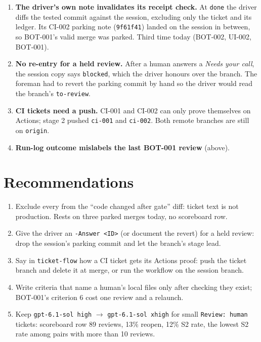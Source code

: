 \documentclass[11pt,a4paper]{article}
\begin{document}
\begin{enumerate}
  \item \textbf{The driver's own note invalidates its receipt check.} At \texttt{done} the
        driver diffs the tested commit against the session, excluding only the ticket and its
        ledger. Its CI-002 parking note (\texttt{9f61f41}) landed on the session in between,
        so BOT-001's valid merge was parked. Third time today (BOT-002, UI-002, BOT-001).
  \item \textbf{No re-entry for a held review.} After a human answers a \emph{Needs your
        call}, the session copy says \texttt{blocked}, which the driver honours over the
        branch. The foreman had to revert the parking commit by hand so the driver would read
        the branch's \texttt{to-review}.
  \item \textbf{CI tickets need a push.} CI-001 and CI-002 can only prove themselves on
        Actions; stage 2 pushed \texttt{ci-001} and \texttt{ci-002}. Both remote branches are
        still on \texttt{origin}.
  \item \textbf{Run-log outcome mislabels the last BOT-001 review} (above).
\end{enumerate}

\section*{Recommendations}

\begin{enumerate}
  \item Exclude every  from the ``code changed after gate'' diff:
        ticket text is not production. Rests on three parked merges today, no scoreboard row.
  \item Give the driver an \texttt{-Answer <ID>} (or document the revert) for a held review:
        drop the session's parking commit and let the branch's stage lead.
  \item Say in \texttt{ticket-flow} how a CI ticket gets its Actions proof: push the ticket
        branch and delete it at merge, or run the workflow on the session branch.
  \item Write criteria that name a human's local files only after checking they exist;
        BOT-001's criterion 6 cost one review and a relaunch.
  \item Keep \texttt{gpt-6.1-sol high} $\rightarrow$ \texttt{gpt-6.1-sol xhigh} for small
        \texttt{Review: human} tickets: scoreboard row 89 reviews, 13\% reopen, 12\% S2 rate,
        the lowest S2 rate among pairs with more than 10 reviews.
\end{enumerate}
\end{document}
